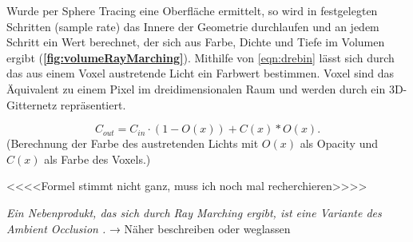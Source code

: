 Wurde per Sphere Tracing eine Oberfläche ermittelt, so wird in festgelegten Schritten (sample rate) das Innere der Geometrie durchlaufen
und an jedem Schritt ein Wert berechnet, der sich aus Farbe, Dichte und Tiefe im Volumen ergibt (\textbf{\autoref{fig:volumeRayMarching}}).
Mithilfe von \autoref{eqn:drebin} \parencite{Drebin1988} lässt sich durch das aus einem Voxel austretende Licht ein Farbwert bestimmen.
Voxel sind das Äquivalent zu einem Pixel im dreidimensionalen Raum und werden durch ein 3D-Gitternetz repräsentiert.

\begin{equation}
	\label{eqn:drebin}
	C_{out} = C_{in} \cdot (1 - O(x)) + C(x) * O(x).
\end{equation}
(Berechnung der Farbe des austretenden Lichts mit $O(x)$ als Opacity und $C(x)$ als Farbe des Voxels.)


<<<<Formel stimmt nicht ganz, muss ich noch mal recherchieren>>>>

\textit{
	Ein Nebenprodukt, das sich durch Ray Marching ergibt, ist eine Variante des Ambient Occlusion \parencite{Evans2006}.
}
→ Näher beschreiben oder weglassen
